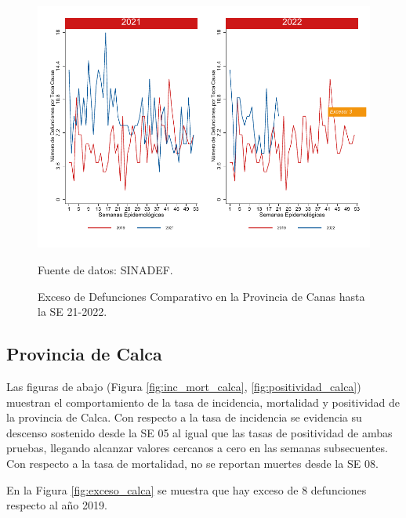\documentclass[12pt,a4paper,openany]{book}
\begin{document}
	\begin{figure}[h]
		\caption{Exceso de Defunciones Comparativo en la Provincia de Canas hasta la SE 21-2022.}\label{fig:exceso_canas}
		\begin{center}
			\includegraphics[width=0.7\linewidth]{../figuras/exceso_3.pdf}
		\end{center}
		{\footnotesize {Fuente de datos: SINADEF.}}
	\end{figure}
	
	\clearpage
	
	\subsection*{Provincia de Calca}
	\noindent Las figuras de abajo (Figura \ref{fig:inc_mort_calca}, \ref{fig:positividad_calca}) muestran el comportamiento de la tasa de incidencia, mortalidad y  positividad de  la provincia de Calca. Con respecto a la tasa de incidencia se evidencia su descenso sostenido desde la SE 05 al igual que las tasas de positividad de ambas pruebas, llegando alcanzar valores cercanos a cero en las semanas subsecuentes. Con respecto a la tasa de mortalidad, no se reportan muertes desde la SE 08. 
	
	En la Figura \ref{fig:exceso_calca} se muestra que hay exceso de 8 defunciones respecto al año 2019.
	
\end{document}
